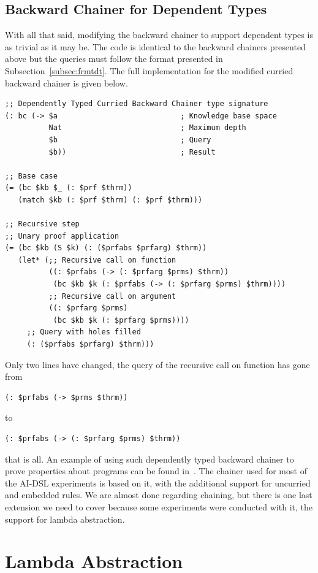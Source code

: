 \documentclass[]{report}
\begin{document}
\subsection{Backward Chainer for Dependent Types}

With all that said, modifying the backward chainer to support
dependent types is as trivial as it may be.  The code is identical to
the backward chainers presented above but the queries must follow the
format presented in Subsection~\ref{subsec:frmtdt}.  The full
implementation for the modified curried backward chainer is given
below.
\begin{verbatim}
;; Dependently Typed Curried Backward Chainer type signature
(: bc (-> $a                            ; Knowledge base space
          Nat                           ; Maximum depth
          $b                            ; Query
          $b))                          ; Result

;; Base case
(= (bc $kb $_ (: $prf $thrm))
   (match $kb (: $prf $thrm) (: $prf $thrm)))

;; Recursive step
;; Unary proof application
(= (bc $kb (S $k) (: ($prfabs $prfarg) $thrm))
   (let* (;; Recursive call on function
          ((: $prfabs (-> (: $prfarg $prms) $thrm))
           (bc $kb $k (: $prfabs (-> (: $prfarg $prms) $thrm))))
          ;; Recursive call on argument
          ((: $prfarg $prms)
           (bc $kb $k (: $prfarg $prms))))
     ;; Query with holes filled
     (: ($prfabs $prfarg) $thrm)))
\end{verbatim}
Only two lines have changed, the query of the recursive call on
function has gone from
\begin{verbatim}
(: $prfabs (-> $prms $thrm))
\end{verbatim}
to
\begin{verbatim}
(: $prfabs (-> (: $prfarg $prms) $thrm))
\end{verbatim}
that is all.  An example of using such dependently typed backward
chainer to prove properties about programs can be found
in~\cite{ChainingProgramProp}.  The chainer used for most of the
AI-DSL experiments is based on it, with the additional support for
uncurried and embedded rules.  We are almost done regarding chaining,
but there is one last extension we need to cover because some
experiments were conducted with it, the support for lambda
abstraction.

\section{Lambda Abstraction}
\end{document}
